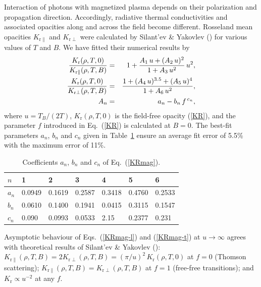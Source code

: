 \documentclass{aa}
\begin{document}
Interaction of photons with magnetized plasma
depends on their polarization and propagation direction.
Accordingly, radiative thermal conductivities
and associated opacities along and across the field
become different.
Rosseland mean opacities
$K_{\mathrm{r}\|}$ and $K_{\mathrm{r}\perp}$
were calculated by Silant'ev \& Yakovlev (\cite{SilYak})
for various values
of $T$ and $B$.
We have fitted their numerical results by
%
\begin{eqnarray}
   { K_\mathrm{r}(\rho,T,0)\over K_{\mathrm{r}\|}(\rho,T,B)} &=& 1+
      {A_1\,u+(A_2\,u)^2 \over 1+A_3\,u^2}\,u^2,
\label{KRmag-l}
\\
   { K_\mathrm{r}(\rho,T,0)\over K_{\mathrm{r}\perp}(\rho,T,B)} &=& {1+
      (A_4\,u)^{3.5}+(A_5\,u)^4 \over 1+A_6\,u^2},
\label{KRmag-t}
\\
  A_n &=& a_n - b_n\,f^{\,c_n},
\label{KRmag}
\end{eqnarray}
%
where $u=T_B/(2T)$,
$K_\mathrm{r}(\rho,T,0)$ is the field-free opacity (\ref{KR}),
and the parameter $f$ introduced in Eq.~(\ref{KR})
is calculated at $B=0$.
The best-fit parameters $a_n$, $b_n$ and $c_n$
given in Table~\ref{tab-KRmag} ensure an average
fit error of 5.5\% with the maximum error of 11\%.

\begin{table}
\caption{Coefficients $a_n$, $b_n$ and $c_n$
of Eq.~(\protect\ref{KRmag}).
}
\label{tab-KRmag}
\begin{center}
\begin{tabular}{lllllll}
\hline
$n$ & 1 & 2 & 3 & 4 & 5 & 6\\
\hline
$a_n$ & 0.0949 & 0.1619 & 0.2587 & 0.3418 & 0.4760 & 0.2533\\
$b_n$ & 0.0610 & 0.1400 & 0.1941 & 0.0415 & 0.3115 & 0.1547\\
$c_n$ & 0.090 & 0.0993 & 0.0533 & 2.15 & 0.2377 & 0.231 \\
\hline
\end{tabular}
\end{center}
\end{table}

Asymptotic behaviour of Eqs.~(\ref{KRmag-l}) and (\ref{KRmag-t})
at $u\to\infty$ agrees with theoretical results of Silant'ev \& Yakovlev
(\cite{SilYak}): 
$K_{\mathrm{r}\|}(\rho,T,B)=2K_{\mathrm{r}\perp}(\rho,T,B)
                        =(\pi/u)^2\,K_\mathrm{r}(\rho,T,0)$
at $f=0$ (Thomson scattering);
$K_{\mathrm{r}\|}(\rho,T,B)=K_{\mathrm{r}\perp}(\rho,T,B)$
at $f=1$ (free-free transitions);
and  $K_\mathrm{r}\propto u^{-2}$ at any $f$.
\end{document}

